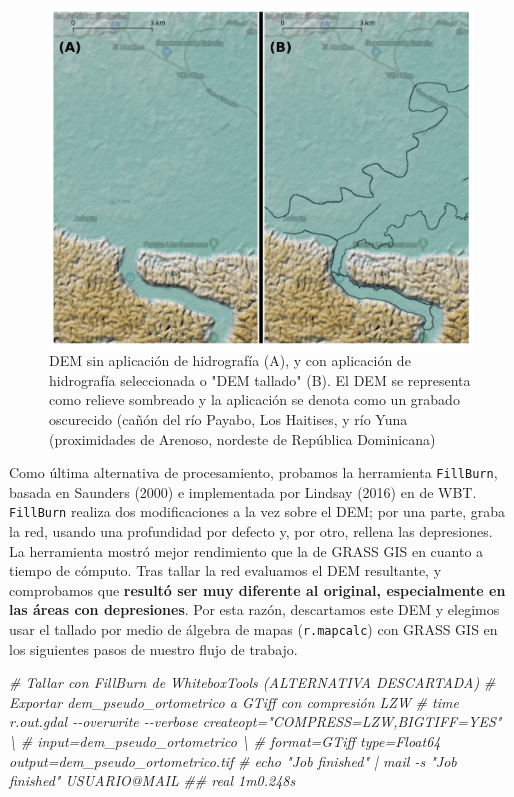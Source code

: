 \documentclass[spanish]{article}
\newenvironment{Shaded}{\begin{snugshade}}{\end{snugshade}}
\newcommand{\CommentTok}[1]{\textcolor[rgb]{0.56,0.35,0.01}{\textit{#1}}}
\begin{document}
\begin{figure}

{\centering \includegraphics[width=0.8\linewidth]{figuras/dem-sin-tallar-tallado} 

}

\caption{DEM sin aplicación de hidrografía (A), y con aplicación de hidrografía seleccionada o "DEM tallado" (B). El DEM se representa como relieve sombreado y la aplicación se denota como un grabado oscurecido (cañón del río Payabo, Los Haitises, y río Yuna (proximidades de Arenoso, nordeste de República Dominicana)}\label{fig:demtallado}
\end{figure}

Como última alternativa de procesamiento, probamos la herramienta
\texttt{FillBurn}, basada en Saunders (2000) e implementada por Lindsay
(2016) en de WBT. \texttt{FillBurn} realiza dos modificaciones a la vez
sobre el DEM; por una parte, graba la red, usando una profundidad por
defecto y, por otro, rellena las depresiones. La herramienta mostró
mejor rendimiento que la de GRASS GIS en cuanto a tiempo de cómputo.
Tras tallar la red evaluamos el DEM resultante, y comprobamos que
\textbf{resultó ser muy diferente al original, especialmente en las
áreas con depresiones}. Por esta razón, descartamos este DEM y elegimos
usar el tallado por medio de álgebra de mapas (\texttt{r.mapcalc}) con
GRASS GIS en los siguientes pasos de nuestro flujo de trabajo.

\begin{Shaded}
\begin{Highlighting}[]
\CommentTok{\# Tallar con FillBurn de WhiteboxTools  (ALTERNATIVA DESCARTADA)}
\CommentTok{\# Exportar dem\_pseudo\_ortometrico a GTiff con compresión LZW}
\CommentTok{\# time r.out.gdal {-}{-}overwrite {-}{-}verbose createopt="COMPRESS=LZW,BIGTIFF=YES" \textbackslash{}}
\CommentTok{\#  input=dem\_pseudo\_ortometrico \textbackslash{}}
\CommentTok{\#  format=GTiff type=Float64 output=dem\_pseudo\_ortometrico.tif}
\CommentTok{\# echo "Job finished" | mail {-}s "Job finished" USUARIO@MAIL}
\CommentTok{\#\# real 1m0.248s}
\end{Highlighting}
\end{Shaded}
\end{document}
